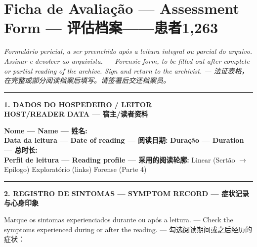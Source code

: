\cleardoublepage
\thispagestyle{empty}
\chapter*{Ficha de Avaliação --- Assessment Form --- 评估档案——患者1,263}

\begingroup

\noindent\textit{Formulário pericial, a ser preenchido após a leitura integral ou parcial do arquivo. Assinar e devolver ao arquivista. --- Forensic form, to be filled out after complete or partial reading of the archive. Sign and return to the archivist. --- 法证表格，在完整或部分阅读档案后填写。请签署后交还档案员。}

\vspace{0.8em}
\noindent\rule{\textwidth}{0.8pt}
\vspace{0.5em}

\noindent\textbf{1. DADOS DO HOSPEDEIRO / LEITOR}\\[-0.15em]
\textbf{\phantom{1. }HOST/READER DATA --- 宿主/读者资料}

\vspace{0.4em}
\noindent\textbf{Nome --- Name --- 姓名:} \dotfill\\[0.4em]
\noindent\textbf{Data da leitura --- Date of reading --- 阅读日期:} \dotfill \quad \textbf{Duração --- Duration --- 总时长:} \dotfill\\[0.4em]
\noindent\textbf{Perfil de leitura --- Reading profile --- 采用的阅读轮廓:} \quad [ ~ ] Linear (Sertão $\to$ Epílogo) \quad [ ~ ] Exploratório (links) \quad [ ~ ] Forense (Parte 4)

\vspace{1em}
\noindent\rule{\textwidth}{0.5pt}
\vspace{0.5em}

\noindent\textbf{2. REGISTRO DE SINTOMAS --- SYMPTOM RECORD --- 症状记录与心身印象}

\vspace{0.4em}
\noindent Marque os sintomas experienciados durante ou após a leitura. --- Check the symptoms experienced during or after the reading. --- 勾选阅读期间或之后经历的症状：


